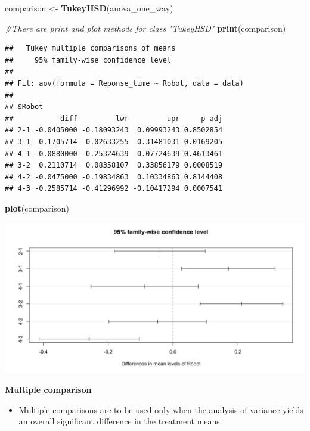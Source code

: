 \documentclass[]{book}
\newenvironment{Shaded}{\begin{snugshade}}{\end{snugshade}}
\newcommand{\CommentTok}[1]{\textcolor[rgb]{0.56,0.35,0.01}{\textit{#1}}}
\newcommand{\KeywordTok}[1]{\textcolor[rgb]{0.13,0.29,0.53}{\textbf{#1}}}
\newcommand{\NormalTok}[1]{#1}
\newcommand{\StringTok}[1]{\textcolor[rgb]{0.31,0.60,0.02}{#1}}
\providecommand{\tightlist}{%
  \setlength{\itemsep}{0pt}\setlength{\parskip}{0pt}}
\begin{document}
\begin{Shaded}
\begin{Highlighting}[]
\NormalTok{comparison <-}\StringTok{ }\KeywordTok{TukeyHSD}\NormalTok{(anova_one_way)}

\CommentTok{#There are print and plot methods for class "TukeyHSD"}
\KeywordTok{print}\NormalTok{(comparison)}
\end{Highlighting}
\end{Shaded}

\begin{verbatim}
##   Tukey multiple comparisons of means
##     95% family-wise confidence level
## 
## Fit: aov(formula = Reponse_time ~ Robot, data = data)
## 
## $Robot
##           diff         lwr         upr     p adj
## 2-1 -0.0405000 -0.18093243  0.09993243 0.8502854
## 3-1  0.1705714  0.02633255  0.31481031 0.0169205
## 4-1 -0.0880000 -0.25324639  0.07724639 0.4613461
## 3-2  0.2110714  0.08358107  0.33856179 0.0008519
## 4-2 -0.0475000 -0.19834863  0.10334863 0.8144408
## 4-3 -0.2585714 -0.41296992 -0.10417294 0.0007541
\end{verbatim}

\begin{Shaded}
\begin{Highlighting}[]
\KeywordTok{plot}\NormalTok{(comparison)}
\end{Highlighting}
\end{Shaded}

\begin{center}\includegraphics{figure/unnamed-chunk-16-1} \end{center}

\textbf{Multiple comparison}

\begin{itemize}
\tightlist
\item
  Multiple comparisons are to be used only when the analysis of variance yields an overall significant difference in the treatment means.
\end{itemize}
\end{document}
